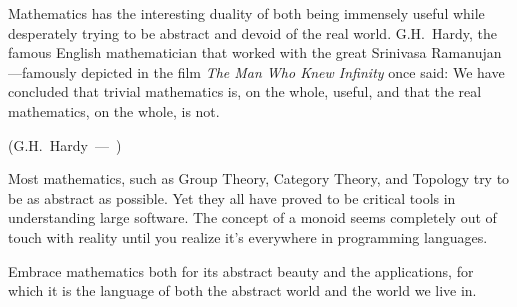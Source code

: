 \documentclass{article}
\let\oldquote\quote
\let\endoldquote\endquote
\renewenvironment{quote}[2][]
{\if\relax\detokenize{#1}\relax
	\def\quoteauthor{#2}%
	\else
	\def\quoteauthor{#2~---~#1}%
	\fi
	\oldquote}
{\par\nobreak\smallskip\hfill(\quoteauthor)%
	\endoldquote\addvspace{\bigskipamount}}
\begin{document}
	Mathematics has the interesting duality of both being immensely useful while desperately trying to be abstract and devoid of the real world. G.H.\ Hardy, the famous English mathematician that worked with the great Srinivasa Ramanujan---famously depicted in the film \textit{The Man Who Knew Infinity} once said:
	\begin{quote}{G.H.\ Hardy}
		We have concluded that trivial mathematics is, on the whole, useful, and that the real mathematics, on the whole, is not.
	\end{quote}
	
	Most mathematics, such as Group Theory, Category Theory, and Topology try to be as abstract as possible. Yet they all have proved to be critical tools in understanding large software. The concept of a monoid seems completely out of touch with reality until you realize it's everywhere in programming languages. 
	
	Embrace mathematics both for its abstract beauty and the applications, for which it is the language of both the abstract world and the world we live in.
\end{document}
